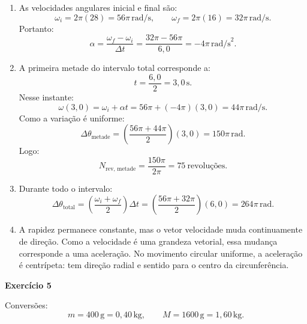 \documentclass[12pt]{article}
\begin{document}
\begin{enumerate}[label=\textbf{\alph*)}]
    \item As velocidades angulares inicial e final são:
    \[
    \omega_i=2\pi(28)=56\pi\,\text{rad/s},
    \qquad
    \omega_f=2\pi(16)=32\pi\,\text{rad/s}.
    \]
    Portanto:
    \[
    \alpha=\frac{\omega_f-\omega_i}{\Delta t}
    =\frac{32\pi-56\pi}{6,0}
    =-4\pi\,\text{rad/s}^2.
    \]

    \item A primeira metade do intervalo total corresponde a:
    \[
    t=\frac{6,0}{2}=3,0\,\text{s}.
    \]
    Nesse instante:
    \[
    \omega(3,0)
    =\omega_i+\alpha t
    =56\pi+(-4\pi)(3,0)
    =44\pi\,\text{rad/s}.
    \]
    Como a variação é uniforme:
    \[
    \Delta\theta_{\text{metade}}
    =\left(\frac{56\pi+44\pi}{2}\right)(3,0)
    =150\pi\,\text{rad}.
    \]
    Logo:
    \[
    N_{\text{rev, metade}}
    =\frac{150\pi}{2\pi}
    =75\ \text{revoluções}.
    \]

    \item Durante todo o intervalo:
    \[
    \Delta\theta_{\text{total}}
    =\left(\frac{\omega_i+\omega_f}{2}\right)\Delta t
    =\left(\frac{56\pi+32\pi}{2}\right)(6,0)
    =264\pi\,\text{rad}.
    \]

    \item A rapidez permanece constante, mas o vetor velocidade muda continuamente
    de direção. Como a velocidade é uma grandeza vetorial, essa mudança corresponde
    a uma aceleração. No movimento circular uniforme, a aceleração é centrípeta:
    tem direção radial e sentido para o centro da circunferência.
\end{enumerate}

\vspace{0.2cm}

\textbf{Exercício 5}

Conversões:
\[
m=400\,\text{g}=0,40\,\text{kg},
\qquad
M=1600\,\text{g}=1,60\,\text{kg}.
\]
\end{document}
